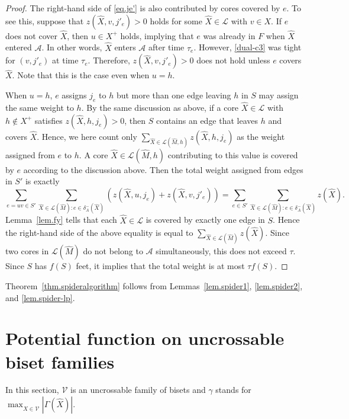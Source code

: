 \documentclass[11pt]{article}
\newcommand{\Afam}{\mathcal{A}}
\newcommand{\Vfam}{\mathcal{V}}
\newcommand{\Lfam}{\mathcal{L}}
\begin{document}
\begin{proof}
 The right-hand side of \eqref{eq.je'} is also contributed by
 cores covered by $e$.
 To see this, suppose that $z(\hat{X},v,j'_e)>0$
 holds for some $\hat{X} \in \Lfam$ with $v \in X$.
 If $e$ does not cover $\hat{X}$,
 then $u \in X^+$ holds, implying that $e$ was already in $F$ when $\hat{X}$ entered
 $\Afam$.
 In other words, $\hat{X}$ enters $\Afam$ after time $\tau_e$.
 However, \eqref{dual-c3} was tight for $(v,j'_e)$ at time $\tau_e$.
 Therefore, $z(\hat{X},v,j'_e)>0$ does not hold unless $e$ covers
 $\hat{X}$. Note that this is the case even when $u=h$.

 When $u=h$, $e$ assigns $j_e$ to $h$ but 
 more than one edge leaving $h$ in $S$ may assign the same weight to $h$.
 By the same discussion as above, 
 if a core $\hat{X} \in \Lfam$ with $h\not\in X^+$ satisfies
 $z(\hat{X},h,j_e)>0$,
 then $S$ contains an edge that leaves $h$ and covers $\hat{X}$.
 Hence, we here count only $\sum_{\hat{X}\in \Lfam(\hat{M},h)}z(\hat{X},h,j_e)$ as the weight assigned from $e$ to $h$.
 A core $\hat{X} \in \Lfam(\hat{M},h)$ contributing to this value is covered by
 $e$ according to the discussion above.
 Then the total weight assigned from edges in $S'$ is exactly
 \[
 \sum_{e=uv \in S'}  \sum_{\hat{X}\in \Lfam(\hat{M}): e \in \delta^-_A(\hat{X})}
 \left(
 z(\hat{X},u,j_e)+ z(\hat{X},v,j'_e)
\right)
= \sum_{e \in S'}  \sum_{\hat{X}\in \Lfam(\hat{M}): e \in \delta^-_A(\hat{X})}z(\hat{X}).
 \]
 Lemma~\ref{lem.fy} tells that each $\hat{X} \in \Lfam$ is covered by exactly one edge in $S$.
 Hence the right-hand side of the above equality is equal to $\sum_{\hat{X} \in \Lfam(\hat{M})}z(\hat{X})$.
 Since two cores in $\Lfam(\hat{M})$ do not belong to $\Afam$ simultaneously, 
 this does not exceed $\tau$.
 Since $S$ has $f(S)$ feet, it implies that 
 the total weight is at most $\tau f(S)$.
 \end{proof}

 Theorem~\ref{thm.spideralgorithm} follows from
 Lemmas~\ref{lem.spider1}, \ref{lem.spider2},
 and \ref{lem.spider-lp}.
 


\section{Potential function on uncrossable biset families}
\label{sec.potential}

In this section, $\Vfam$ is an uncrossable family of bisets
and $\gamma$ stands for $\max_{\hat{X} \in \Vfam}|\Gamma(\hat{X})|$.
\end{document}
